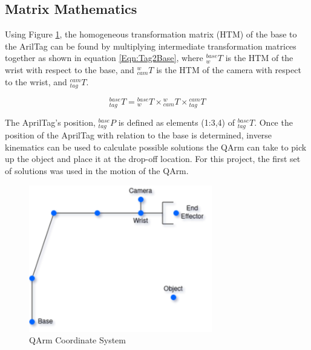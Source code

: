 \subsection{Matrix Mathematics}
Using Figure \ref{Fig:QARM_Coord}, the homogeneous transformation matrix (HTM) of the base to the ArilTag can be found by multiplying intermediate transformation matrices together as shown in equation \ref{Eqn:Tag2Base}, where \({}^{base}_{w}T\) is the HTM of the wrist with respect to the base, and \({}^{w}_{cam}T\) is the HTM of the camera with respect to the wrist, and \({}^{cam}_{tag}T\). 

\begin{equation}
\label{Eqn:Tag2Base}
{}^{base}_{tag}T = {}^{base}_{w}T\times{}^{w}_{cam}T\times{}^{cam}_{tag}T   
\end{equation}

The AprilTag's position, \({}^{base}_{tag}P\) is defined as elements (1:3,4) of \({}^{base}_{tag}T\). Once the position of the AprilTag with relation to the base is determined, inverse kinematics can be used to calculate possible solutions the QArm can take to pick up the object and place it at the drop-off location. For this project, the first set of solutions was used in the motion of the QArm. 

\begin{figure}[htb]
\includegraphics[width=8cm]{Figures/IntroRob_Final_Project_Coordinates.drawio.png}
\caption{QArm Coordinate System}
\centering
\label{Fig:QARM_Coord}
\end{figure}

